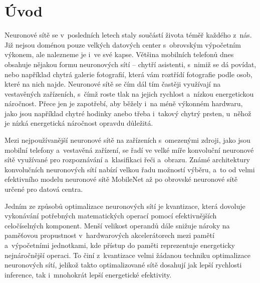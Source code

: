 
%

\chapter{Úvod}
Neuronové sítě se v~posledních letech staly součástí života téměř každého z~nás. Již nejsou doménou pouze velkých datových center s~obrovským výpočetním výkonem, ale nalezneme je i~ve své kapse. Většina mobilních telefonů dnes obsahuje nějakou formu neuronových sítí -- chytří asistenti, s~nimiž se dá povídat, nebo například chytrá galerie fotografií, která vám roztřídí fotografie podle osob, které na nich najde. Neuronové sítě se čím dál tím častěji využívají na vestavěných zařízeních, s~čímž roste tlak na jejich rychlost a~nízkou energetickou náročnost. Přece jen je zapotřebí, aby běžely i~na méně výkonném hardwaru, jako jsou například chytré hodinky anebo třeba i~takový chytrý prsten, u~něhož je nízká energetická náročnost opravdu důležitá. 

Mezi nejpoužívanější neuronové sítě na zařízeních s~omezenými zdroji, jako jsou mobilní telefony a~vestavěná zařízení, se řadí ve velké míře konvoluční neuronové sítě využívané pro rozpoznávání a~klasifikaci řeči a~obrazu. Známé architektury konvolučních neuronových sítí nabízí velkou řadu možností výběru, a~to od velmi efektivního modelu neuronové sítě MobileNet až po obrovské neuronové sítě určené pro datová centra.

Jedním ze způsobů optimalizace neuronových sítí je kvantizace, která dovoluje vykonávání potřebných matematických operací pomocí efektivnějších celočíselných komponent. Menší velikost operandů dále snižuje nároky na paměťovou propustnost v~hardwarových akcelerátorech mezi pamětí a~výpočetními jednotkami, kde přístup do paměti reprezentuje energeticky nejnáročnější operaci. To činí z~kvantizace velmi žádanou techniku optimalizace neuronových sítí, jelikož takto optimalizované sítě dosahují jak lepší rychlosti inference, tak i~mnohokrát lepší energetické efektivity. 


